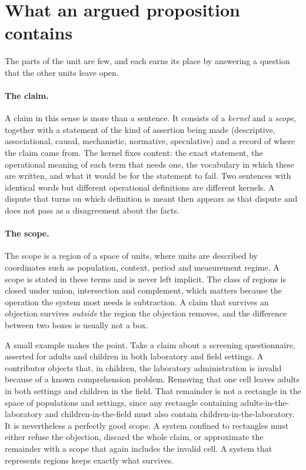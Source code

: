 \documentclass[11pt]{article}
\begin{document}
\section{What an argued proposition contains}\label{sec:parts}

The parts of the unit are few, and each earns its place by answering a question that the other units leave open.

\paragraph{The claim.} A claim in this sense is more than a sentence. It consists of a \emph{kernel} and a \emph{scope}, together with a statement of the kind of assertion being made (descriptive, associational, causal, mechanistic, normative, speculative) and a record of where the claim came from. The kernel fixes content: the exact statement, the operational meaning of each term that needs one, the vocabulary in which these are written, and what it would be for the statement to fail. Two sentences with identical words but different operational definitions are different kernels. A dispute that turns on which definition is meant then appears as that dispute and does not pass as a disagreement about the facts.

\paragraph{The scope.} The scope is a region of a space of units, where units are described by coordinates such as population, context, period and measurement regime. A scope is stated in these terms and is never left implicit. The class of regions is closed under union, intersection and complement, which matters because the operation the system most needs is subtraction. A claim that survives an objection survives \emph{outside} the region the objection removes, and the difference between two boxes is usually not a box.

A small example makes the point. Take a claim about a screening questionnaire, asserted for adults and children in both laboratory and field settings. A contributor objects that, in children, the laboratory administration is invalid because of a known comprehension problem. Removing that one cell leaves adults in both settings and children in the field. That remainder is not a rectangle in the space of populations and settings, since any rectangle containing adults-in-the-laboratory and children-in-the-field must also contain children-in-the-laboratory. It is nevertheless a perfectly good scope. A system confined to rectangles must either refuse the objection, discard the whole claim, or approximate the remainder with a scope that again includes the invalid cell. A system that represents regions keeps exactly what survives.
\end{document}
